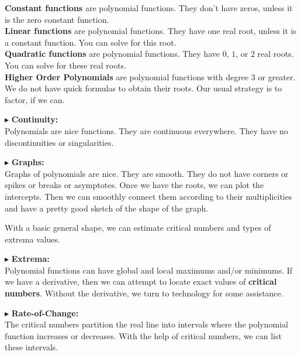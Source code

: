 \documentclass{ximera}
\begin{document}
\textbf{Constant functions} are polynomial functions.  They don't have zeros, unless it is the zero constant function.  \\


\textbf{Linear functions} are polynomial functions. They have one real root, unless it is a constant function.  You can solve for this root. \\


\textbf{Quadratic functions} are polynomial functions. They have $0$, $1$, or $2$ real roots.  You can solve for these real roots. \\


\textbf{Higher Order Polynomials} are polynomial functions with degree $3$ or greater.  We do not have quick formulas to obtain their roots.  Our usual strategy is to factor, if we can.  





$\blacktriangleright$ \textbf{\textcolor{red!10!blue!90!}{Continuity:}} \\ 
Polynomials are nice functions.  They are continuous everywhere.  They have no discontinuities or singularities.



$\blacktriangleright$ \textbf{\textcolor{red!10!blue!90!}{Graphs:}} \\ 
Graphs of polynomials are nice.  They are smooth.  They do not have corners or spikes or breaks or asymptotes. Once we have the roots, we can plot the intercepts.  Then we can smoothly connect them according to their multiplicities and have a pretty good sketch of the shape of the graph.

With a basic general shape, we can estimate critical numbers and types of extrema values.




$\blacktriangleright$  \textbf{\textcolor{red!10!blue!90!}{Extrema:}} \\ 
Polynomial functions can have global and local maximums and/or minimums. If we have a derivative, then we can attempt to locate exact values of \textbf{critical numbers}.  Without the derivative, we turn to technology for some assistance.




$\blacktriangleright$ \textbf{\textcolor{red!10!blue!90!}{Rate-of-Change:}} \\ 
The critical numbers partition the real line into intervals where the polynomial function increases or decreases.  With the help of critical numbers, we can list these intervals.
\end{document}
